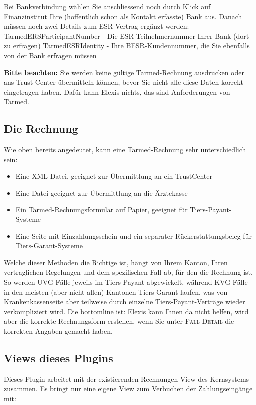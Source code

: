 Bei Bankverbindung wählen Sie anschliessend noch durch Klick auf \glqq
Finanzinstitut\grqq{}  Ihre (hoffentlich schon als Kontakt erfasste)
 Bank aus. Danach müssen noch zwei Details zum ESR-Vertrag ergänzt werden:
TarmedERSParticipantNumber - Die ESR-Teilnehmernummer Ihrer Bank (dort zu erfragen)
TarmedESRIdentity - Ihre BESR-Kundennummer, die Sie ebenfalls von der Bank erfragen müssen

\textbf{Bitte beachten:} Sie werden keine gültige Tarmed-Rechnung ausdrucken
oder ans Trust-Center übermitteln können, bevor Sie nicht alle diese Daten
korrekt eingetragen haben. Dafür kann Elexis nichts, das sind Anforderungen von
Tarmed.

\subsection{Die Rechnung}

Wie oben bereits angedeutet, kann eine Tarmed-Rechnung sehr unterschiedlich sein:

\begin{itemize}
 \item Eine XML-Datei, geeignet zur Übermittlung an ein TrustCenter
\item Eine Datei geeignet zur Übermittlung an die Ärztekasse
\item Ein Tarmed-Rechnungsformular auf Papier, geeignet für Tiers-Payant-Systeme
\item  Eine Seite mit Einzahlungsschein und ein separater Rückerstattungsbeleg für Tiers-Garant-Systeme
\end{itemize}

Welche dieser Methoden die Richtige ist, hängt von Ihrem Kanton, Ihren vertraglichen Regelungen und dem spezifischen Fall ab,
für den die Rechnung ist. So werden UVG-Fälle jeweils im Tiers Payant abgewickelt, während KVG-Fälle in den meisten (aber nicht allen) Kantonen Tiers Garant laufen, was von Krankenkassenseite aber teilweise durch einzelne Tiers-Payant-Verträge
wieder verkompliziert wird. Die bottomline ist: Elexis kann Ihnen da nicht helfen, wird aber die korrekte Rechnungsform erstellen, wenn Sie unter \textsc{Fall Detail}
die korrekten Angaben gemacht haben.

\subsection{Views dieses Plugins}
Dieses Plugin arbeitet mit der existierenden Rechnungen-View des Kernsystems zusammen. Es bringt nur eine eigene View zum Verbuchen der Zahlungseingänge mit:

